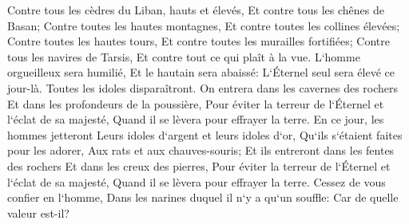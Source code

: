 \verse Contre tous les cèdres du Liban, hauts et élevés, Et contre tous les chênes de Basan; 
\verse Contre toutes les hautes montagnes, Et contre toutes les collines élevées; 
\verse Contre toutes les hautes tours, Et contre toutes les murailles fortifiées; 
\verse Contre tous les navires de Tarsis, Et contre tout ce qui plaît à la vue. 
\verse L`homme orgueilleux sera humilié, Et le hautain sera abaissé: L`Éternel seul sera élevé ce jour-là. 
\verse Toutes les idoles disparaîtront. 
\verse On entrera dans les cavernes des rochers Et dans les profondeurs de la poussière, Pour éviter la terreur de l`Éternel et l`éclat de sa majesté, Quand il se lèvera pour effrayer la terre. 
\verse En ce jour, les hommes jetteront Leurs idoles d`argent et leurs idoles d`or, Qu`ils s`étaient faites pour les adorer, Aux rats et aux chauves-souris; 
\verse Et ils entreront dans les fentes des rochers Et dans les creux des pierres, Pour éviter la terreur de l`Éternel et l`éclat de sa majesté, Quand il se lèvera pour effrayer la terre. 
\verse Cessez de vous confier en l`homme, Dans les narines duquel il n`y a qu`un souffle: Car de quelle valeur est-il? 

